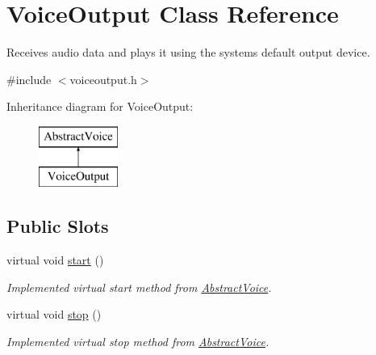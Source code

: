 \hypertarget{class_voice_output}{
\section{\-Voice\-Output \-Class \-Reference}
\label{class_voice_output}
}


\-Receives audio data and plays it using the systems default output device.  




{\ttfamily \#include $<$voiceoutput.\-h$>$}

\-Inheritance diagram for \-Voice\-Output\-:\begin{figure}[H]
\begin{center}
\leavevmode
\includegraphics[height=2.000000cm]{class_voice_output}
\end{center}
\end{figure}
\subsection*{\-Public \-Slots}
\begin{DoxyCompactItemize}
\item 
virtual void \hyperlink{class_voice_output_ab73d7fc81805b8ba0d457db2fcf29ac4}{start} ()
\begin{DoxyCompactList}\small\item\em \-Implemented virtual start method from \hyperlink{class_abstract_voice}{\-Abstract\-Voice}. \end{DoxyCompactList}\item 
virtual void \hyperlink{class_voice_output_ad86ffb5732b221da79f5bfba04e7a35a}{stop} ()
\begin{DoxyCompactList}\small\item\em \-Implemented virtual stop method from \hyperlink{class_abstract_voice}{\-Abstract\-Voice}. \end{DoxyCompactList}\end{DoxyCompactItemize}
